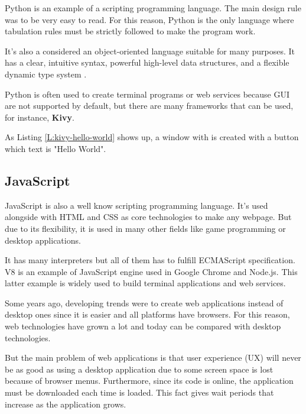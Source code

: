 Python is an example of a scripting programming language. The main design rule
was to be very easy to read. For this reason, Python is the only language where
tabulation rules must be strictly followed to make the program work.

It's also a considered an object-oriented language suitable for many purposes.
It has a clear, intuitive syntax, powerful high-level data structures, and a
flexible dynamic type system \cite{An93pythonfor}.

Python is often used to create terminal programs or web services because GUI
are not supported by default, but there are many frameworks that can be used,
for instance, \textbf{Kivy}.

\begin{codefigure}
\end{codefigure}

As Listing \ref{L:kivy-hello-world} shows up, a window with is created with a
button which text is "Hello World".

\subsection{JavaScript}

JavaScript is also a well know scripting programming language. It's used
alongside with HTML and CSS as core technologies to make any webpage. But due
to its flexibility, it is used in many other fields like game programming or
desktop applications.

It has many interpreters but all of them has to fulfill ECMAScript
specification. V8 is an example of JavaScript engine used in Google Chrome and
Node.js. This latter example is widely used to build terminal applications and
web services.

Some years ago, developing trends were to create web applications instead of
desktop ones since it is easier and all platforms have browsers. For this
reason, web technologies have grown a lot and today can be compared with
desktop technologies.

But the main problem of web applications is that user experience (UX) will
never be as good as using a desktop application due to some screen space is
lost because of browser menus. Furthermore, since its code is online, the
application must be downloaded each time is loaded. This fact gives wait 
periods that increase as the application grows.

